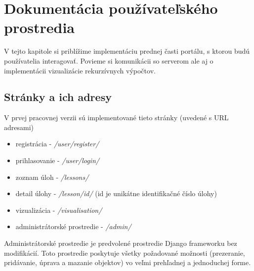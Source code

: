 \chapter{Dokumentácia používateľského prostredia}

\label{kap:frontImpl}
V tejto kapitole si priblížime implementáciu prednej časti portálu, s ktorou
budú používatelia interagovať. Povieme si komunikácii so serverom ale aj o
implementácii vizualizácie rekurzívnych výpočtov.
\section{Stránky a ich adresy}
V prvej pracovnej verzii sú implementované tieto stránky (uvedené s URL adresami)
\begin{itemize}
  \item registrácia - \textit{/user/register/}
  \item prihlasovanie - \textit{/user/login/}
  \item zoznam úloh - \textit{/lessons/}
  \item detail úlohy - \textit{/lesson/id/} (id je unikátne identifikačné číslo úlohy)
  \item vizualizácia - \textit{/visualisation/}
  \item administrátorské prostredie - \textit{/admin/}
\end{itemize}

Administrátorské prostredie je predvolené prostredie Django frameworku bez modifikácií.
Toto prostredie poskytuje všetky požadované možnosti (prezeranie, pridávanie, úprava
a mazanie objektov) vo veľmi prehľadnej a jednoduchej forme.
